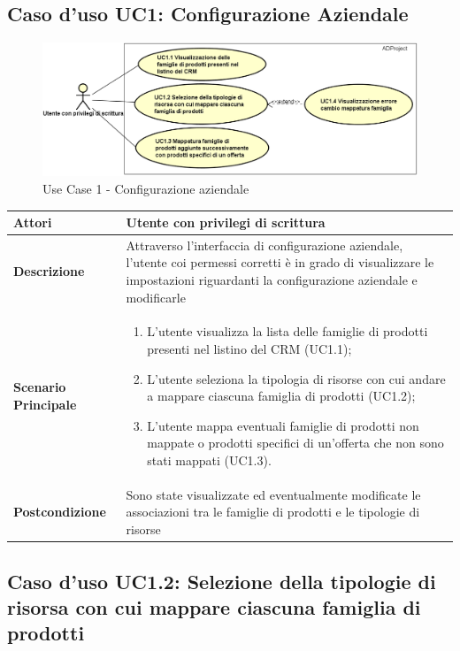 
	\hypertarget{UC1}{}
	\subsection{Caso d'uso UC1: Configurazione Aziendale}
	
	\begin{figure}[H]
		\centering
		\includegraphics[scale=0.55]{images/useCase/UC1}
		\caption{Use Case 1 - Configurazione aziendale}
		\label{fig:uc1}
	\end{figure}
	\begin{longtable}{ | p{2.7cm} | p{12cm} |}
		\hline \textbf{Attori} & Utente con privilegi di scrittura\\ 
		\hline \textbf{Descrizione} & Attraverso l’interfaccia di configurazione aziendale, l’utente coi permessi corretti è in grado di visualizzare le impostazioni riguardanti la configurazione aziendale e modificarle\\ 
		\hline \textbf{Scenario Principale} & \begin{enumerate}
			\itemsep-0.5em 
			\item L’utente visualizza la lista delle famiglie di prodotti presenti nel listino del CRM  (UC1.1);
			\item L’utente seleziona la tipologia di risorse con cui andare a mappare ciascuna famiglia di prodotti  (UC1.2);
			\item L’utente mappa eventuali famiglie di prodotti non mappate o prodotti specifici di un’offerta che non sono stati mappati  (UC1.3).
			
		\end{enumerate}
		\\ 
		\hline \textbf{Postcondizione} & Sono state visualizzate ed eventualmente modificate le associazioni tra le famiglie di prodotti e le tipologie di risorse\\ 
		\hline 
	\end{longtable}
	
	\hypertarget{UC1.2}{}
	\subsection{Caso d'uso UC1.2: Selezione della tipologie di risorsa con cui mappare ciascuna famiglia di prodotti}
	
